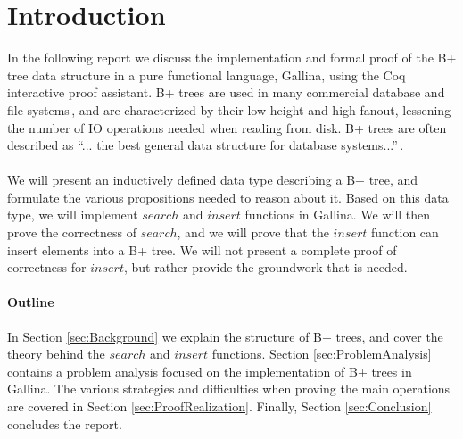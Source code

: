 \section{Introduction}
\label{sec:Introduction}
In the following report we discuss the implementation and formal proof of the B+ tree data structure in a pure functional language, Gallina, using the Coq interactive proof assistant. B+ trees are used in many commercial database and file systems\,\cite[p. 359]{ramakrishnan2003database}, and are characterized by their low height and high fanout, lessening the number of IO operations needed when reading from disk. B+ trees are often described as ``... the best general data structure for database systems...''\,\cite[p. 84]{shasha2002database}.
\paragraph{}
We will present an inductively defined data type describing a B+ tree, and formulate the various propositions needed to reason about it. Based on this data type, we will implement $search$ and $insert$ functions in Gallina. We will then prove the correctness of $search$, and we will prove that the $insert$ function can insert elements into a B+ tree. We will not present a complete proof of correctness for $insert$, but rather provide the groundwork that is needed.
\paragraph{Outline}
In Section \ref{sec:Background} we explain the structure of B+ trees, and cover the theory behind the $search$ and $insert$ functions. Section \ref{sec:ProblemAnalysis} contains a problem analysis focused on the implementation of B+ trees in Gallina. The various strategies and difficulties when proving the main operations are covered in Section \ref{sec:ProofRealization}. Finally, Section \ref{sec:Conclusion} concludes the report.
